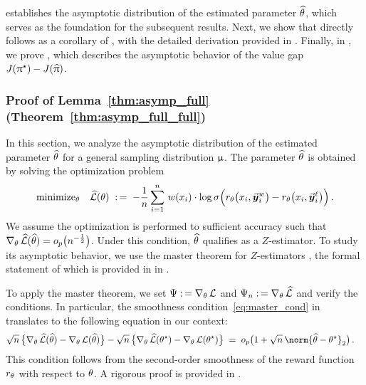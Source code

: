      establishes the asymptotic distribution of the estimated parameter $\widehat{\theta}$, which serves as the foundation for the subsequent results. 
	Next, we show that  directly follows as a corollary of , with the detailed derivation provided in . Finally, in , we prove , which describes the asymptotic behavior of the value gap $J(\uppi^{\star}) - J(\widehat{\uppi})$.
		
	\subsubsection{Proof of Lemma~\ref{thm:asymp_full} (Theorem~\ref{thm:asymp_full_full}) \yaqidone}
	\label{sec:proof:thm:asymp_full}
	

	In this section, we analyze the asymptotic distribution of the estimated parameter $\widehat{\theta}$ for a general sampling distribution $\upmu$. The parameter $\widehat{\theta}$ is obtained by solving the optimization problem
	\begin{align*}
		{\rm minimize}_{\theta} \quad
		\widehat{\mathcal{L}}(\theta) \; :\,= \;
		- \frac{1}{n} \sum_{i=1}^{n} \, w(x_{i}) \cdot \log \sigma \Big( r_{\theta}\big(x_{i}, \vec{\boldsymbol{y}}\!\,^w_{i}\big) - r_{\theta}\big(x_{i}, \vec{\boldsymbol{y}}\!\,^{\ell}_{i}\big) \Big) \, .
	\end{align*}
	We assume the optimization is performed to sufficient accuracy such that $\nabla_{\theta} \,  \widehat{\mathcal{L}}(\widehat{\theta}) = o_p\big(n^{-\frac{1}{2}}\big)$.
	Under this condition, $\widehat{\theta}$ qualifies as a $Z$-estimator.
	To study its asymptotic behavior, we use the master theorem for $Z$-estimators \citep{kosorok2008introduction}, the formal statement of which is provided in  in .
	
	To apply the master theorem, we set $\Psi :\,= \nabla_{\theta} \,  \mathcal{L}$ and $\Psi_{n} :\,= \nabla_{\theta} \,  \widehat{\mathcal{L}}$ and verify the conditions. In particular, the smoothness condition~\eqref{eq:master_cond} in  translates to the following equation in our context:
    \begin{align}
    	\label{eq:master_cond_proof}
    	& \sqrt{n} \, \big\{ \gradtheta \Losshat (\parathetahat) - \gradtheta \Loss(\parathetahat) \big\} - \sqrt{n} \, \big\{ \gradtheta \Losshat (\parathetastar) - \gradtheta \Loss (\parathetastar) \big\}  
    	\; = \; \smallop \big( 1 + \sqrt{n} \, \norm{ \parathetahat - \parathetastar }_2 \big) \, .
    \end{align}
    This condition follows from the second-order smoothness of the reward function $r_{\theta}$ with respect to $\theta$. A rigorous proof is provided in .
    

